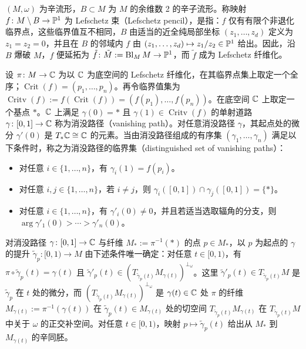 
$(M,\omega)$ 为辛流形，$B\subset M$ 为 $M$ 的余维数 2 的辛子流形。称映射 $f\colon M\setminus B\to\mathbb{P}^1$ 为 Lefschetz 束（Lefschetz pencil），是指：$f$ 仅有有限个非退化临界点，这些临界值互不相同，$B$ 由适当的近全纯局部坐标 $(z_1,\ldots,z_d)$ 定义为 $z_1=z_2=0$，并且在 $B$ 的邻域内 $f$ 由 $(z_1,\ldots,z_d)\mapsto z_1/z_2\in\mathbb{P}^1$ 给出。因此，沿 $B$ 爆破 $M$，$f$ 便延拓为 $\tilde f\colon\tilde M:=\operatorname{Bl}_M M\to\mathbb{P}^1$，而 $\tilde f$ 成为 Lefschetz 纤维化。


设 $\pi\colon M\to\mathbb{C}$ 为以 $\mathbb{C}$ 为底空间的 Lefschetz 纤维化，在其临界点集上取定一个全序；$\operatorname{Crit}(f)=(p_1,\ldots,p_n)$。再令临界值集为 $\operatorname{Critv}(f):=f(\operatorname{Crit}(f))=(f(p_1),\ldots,f(p_n))$。在底空间 $\mathbb{C}$ 上取定一个基点 $*$。$\mathbb{C}$ 上满足 $\gamma(0)=*$ 且 $\gamma(1)\in\operatorname{Critv}(f)$ 的单射道路 $\gamma\colon[0,1]\to\mathbb{C}$ 称为消没路径（vanishing path）。对任意消没路径 $\gamma$，其起点处的微分 $\gamma'(0)$ 是 $T_*\mathbb{C}\cong\mathbb{C}$ 的元素。当由消没路径组成的有序集 $(\gamma_1,\ldots,\gamma_n)$ 满足以下条件时，称之为消没路径的临界集（distinguished set of vanishing paths）：


\begin{itemize}
  \item 对任意 $i\in\{1,\ldots,n\}$，有 $\gamma_i(1)=f(p_i)$。
  \item 对任意 $i,j\in\{1,\ldots,n\}$，若 $i\ne j$，则 $\gamma_i([0,1])\cap\gamma_j([0,1])=\{*\}$。
  \item 对任意 $i\in\{1,\ldots,n\}$，有 $\gamma'_i(0)\ne0$，并且若适当选取辐角的分支，则 $\arg\gamma'_1(0)>\cdots>\gamma'_n(0)$。
\end{itemize}

对消没路径 $\gamma\colon[0,1]\to\mathbb{C}$ 与纤维 $M_*:=\pi^{-1}(*)$ 的点 $p\in M_*$，以 $p$ 为起点的 $\gamma$ 的提升 $\tilde\gamma_p\colon[0,1)\to M$ 由下述条件唯一确定：对任意 $t\in[0,1)$，有 $\pi\circ\tilde\gamma_p(t)=\gamma(t)$ 且 $\tilde\gamma'_p(t)\in\left(T_{\tilde\gamma_p(t)}M_{\gamma(t)}\right)^{\perp_\omega}$。这里 $\tilde\gamma'_p(t)\in T_{\tilde\gamma_p(t)}M$ 是 $\tilde\gamma_p$ 在 $t$ 处的微分，而 $\left(T_{\tilde\gamma_p(t)}M_{\gamma(t)}\right)^{\perp_\omega}$ 是 $\gamma(t)\in\mathbb{C}$ 处 $\pi$ 的纤维 $M_{\gamma(t)}:=\pi^{-1}(\gamma(t))$ 在 $\tilde\gamma_p(t)\in M_{\gamma(t)}$ 处的切空间 $T_{\tilde\gamma_p(t)}M_{\gamma(t)}$ 在 $T_{\tilde\gamma_p(t)}M$ 中关于 $\omega$ 的正交补空间。对任意 $t\in[0,1)$，映射 $p\mapsto\tilde\gamma_p(t)$ 给出从 $M_*$ 到 $M_{\gamma(t)}$ 的辛同胚。


